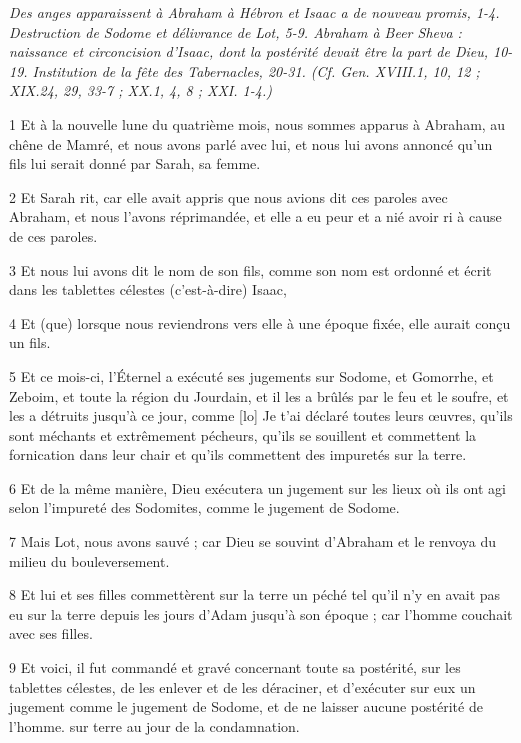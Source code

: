 
\par \textit{Des anges apparaissent à Abraham à Hébron et Isaac a de nouveau promis, 1-4. Destruction de Sodome et délivrance de Lot, 5-9. Abraham à Beer Sheva : naissance et circoncision d'Isaac, dont la postérité devait être la part de Dieu, 10-19. Institution de la fête des Tabernacles, 20-31. (Cf. Gen. XVIII.1, 10, 12 ; XIX.24, 29, 33-7 ; XX.1, 4, 8 ; XXI. 1-4.)}

\par 1 Et à la nouvelle lune du quatrième mois, nous sommes apparus à Abraham, au chêne de Mamré, et nous avons parlé avec lui, et nous lui avons annoncé qu'un fils lui serait donné par Sarah, sa femme.
\par 2 Et Sarah rit, car elle avait appris que nous avions dit ces paroles avec Abraham, et nous l'avons réprimandée, et elle a eu peur et a nié avoir ri à cause de ces paroles.
\par 3 Et nous lui avons dit le nom de son fils, comme son nom est ordonné et écrit dans les tablettes célestes (c'est-à-dire) Isaac,
\par 4 Et (que) lorsque nous reviendrons vers elle à une époque fixée, elle aurait conçu un fils.
\par 5 Et ce mois-ci, l'Éternel a exécuté ses jugements sur Sodome, et Gomorrhe, et Zeboim, et toute la région du Jourdain, et il les a brûlés par le feu et le soufre, et les a détruits jusqu'à ce jour, comme [lo] Je t'ai déclaré toutes leurs œuvres, qu'ils sont méchants et extrêmement pécheurs, qu'ils se souillent et commettent la fornication dans leur chair et qu'ils commettent des impuretés sur la terre.
\par 6 Et de la même manière, Dieu exécutera un jugement sur les lieux où ils ont agi selon l'impureté des Sodomites, comme le jugement de Sodome.
\par 7 Mais Lot, nous avons sauvé ; car Dieu se souvint d'Abraham et le renvoya du milieu du bouleversement.
\par 8 Et lui et ses filles commettèrent sur la terre un péché tel qu'il n'y en avait pas eu sur la terre depuis les jours d'Adam jusqu'à son époque ; car l'homme couchait avec ses filles.
\par 9 Et voici, il fut commandé et gravé concernant toute sa postérité, sur les tablettes célestes, de les enlever et de les déraciner, et d'exécuter sur eux un jugement comme le jugement de Sodome, et de ne laisser aucune postérité de l'homme. sur terre au jour de la condamnation.
